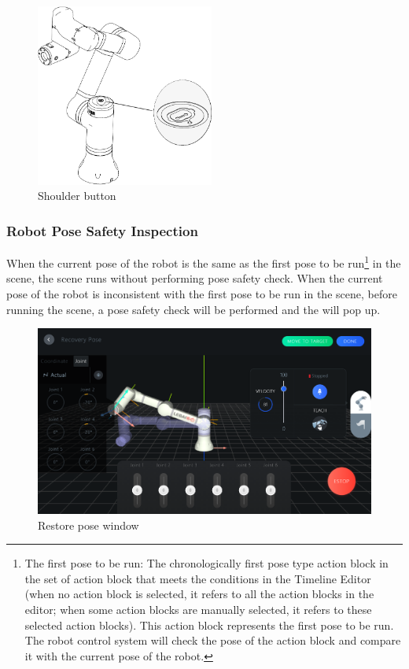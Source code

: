 
\begin{figure}[ht]
	\centering
	\includegraphics[height=6cm]{en/image/shoulder_btn.pdf}
	\caption{Shoulder button}
	\label{fig:肩部按钮示意图}
\end{figure}

\subsubsection{Robot Pose Safety Inspection}
When the current pose of the robot is the same as the first pose to be run\footnote{The first pose to be run: The chronologically first pose type action block in the set of action block that meets the conditions in the Timeline Editor (when no action block is selected, it refers to all the action blocks in the editor; when some action blocks are manually selected, it refers to these selected action blocks). This action block represents the first pose to be run. The robot control system will check the pose of the action block and compare it with the current pose of the robot.} in the scene, the scene runs without performing pose safety check. When the current pose of the robot is inconsistent with the first pose to be run in the scene, before running the scene, a pose safety check will be performed and the  will pop up.

\begin{figure}[ht]
	\centering
	\includegraphics[width=\textwidth]{en/image/position_check.png}
	\caption{Restore pose window}
	\label{fig:位置安全检查页}
\end{figure}

